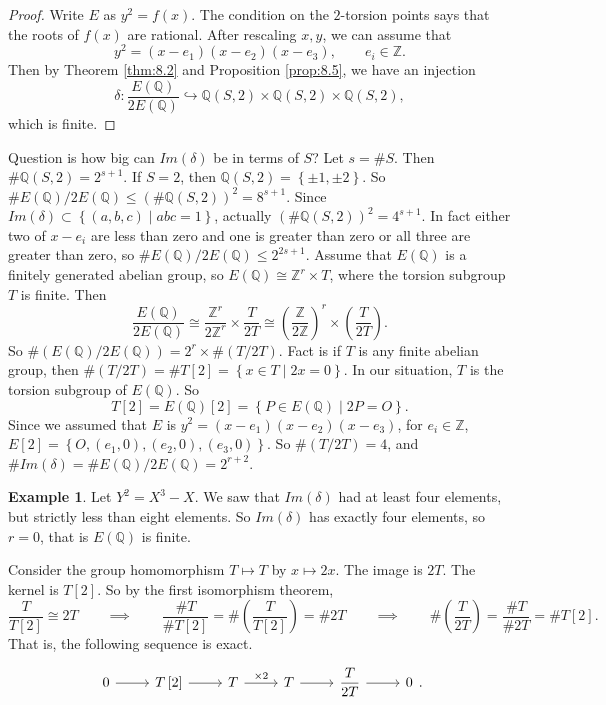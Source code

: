 \documentclass{article}
\newcommand{\Z}{\mathbb{Z}}
\newcommand{\Q}{\mathbb{Q}}
\newcommand{\rb}[1]{\left( #1 \right)}
\renewcommand{\sb}[1]{\left[ #1 \right]}
\newcommand{\cb}[1]{\left\{ #1 \right\}}
\theoremstyle{definition}\newtheorem{definition}{Definition}[section]
\theoremstyle{definition}\newtheorem{remark}[definition]{Remark}
\theoremstyle{definition}\newtheorem*{example}{Example}
\theoremstyle{definition}\newtheorem*{note}{Note}
\begin{document}
\begin{proof}
Write $ E $ as $ y^2 = f\rb{x} $. The condition on the $ 2 $-torsion points says that the roots of $ f\rb{x} $ are rational. After rescaling $ x, y $, we can assume that
$$ y^2 = \rb{x - e_1}\rb{x - e_2}\rb{x - e_3}, \qquad e_i \in \Z. $$
Then by Theorem \ref{thm:8.2} and Proposition \ref{prop:8.5}, we have an injection
$$ \delta : \dfrac{E\rb{\Q}}{2E\rb{\Q}} \hookrightarrow \Q\rb{S, 2} \times \Q\rb{S, 2} \times \Q\rb{S, 2}, $$
which is finite.
\end{proof}

Question is how big can $ Im\rb{\delta} $ be in terms of $ S $? Let $ s = \#S $. Then $ \#\Q\rb{S, 2} = 2^{s + 1} $. If $ S = 2 $, then $ \Q\rb{S, 2} = \cb{\pm 1, \pm 2} $. So $ \#E\rb{\Q} / 2E\rb{\Q} \le \rb{\#\Q\rb{S, 2}}^2 = 8^{s + 1} $. Since $ Im\rb{\delta} \subset \cb{\rb{a, b, c} \mid abc = 1} $, actually $ \rb{\#\Q\rb{S, 2}}^2 = 4^{s + 1} $. In fact either two of $ x - e_i $ are less than zero and one is greater than zero or all three are greater than zero, so $ \#E\rb{\Q} / 2E\rb{\Q} \le 2^{2s + 1} $. Assume that $ E\rb{\Q} $ is a finitely generated abelian group, so $ E\rb{\Q} \cong \Z^r \times T $, where the torsion subgroup $ T $ is finite. Then
$$ \dfrac{E\rb{\Q}}{2E\rb{\Q}} \cong \dfrac{\Z^r}{2\Z^r} \times \dfrac{T}{2T} \cong \rb{\dfrac{\Z}{2\Z}}^r \times \rb{\dfrac{T}{2T}}. $$
So $ \#\rb{E\rb{\Q} / 2E\rb{\Q}} = 2^r \times \#\rb{T / 2T} $. Fact is if $ T $ is any finite abelian group, then $ \#\rb{T / 2T} = \#T\sb{2} = \cb{x \in T \mid 2x = 0} $. In our situation, $ T $ is the torsion subgroup of $ E\rb{\Q} $. So
$$ T\sb{2} = E\rb{\Q}\sb{2} = \cb{P \in E\rb{\Q} \mid 2P = O}. $$
Since we assumed that $ E $ is $ y^2 = \rb{x - e_1}\rb{x - e_2}\rb{x - e_3} $, for $ e_i \in \Z $, $ E\sb{2} = \cb{O, \rb{e_1, 0}, \rb{e_2, 0}, \rb{e_3, 0}} $. So $ \#\rb{T / 2T} = 4 $, and $ \#Im\rb{\delta} = \#E\rb{\Q} / 2E\rb{\Q} = 2^{r + 2} $.

\begin{example}
Let $ Y^2 = X^3 - X $. We saw that $ Im\rb{\delta} $ had at least four elements, but strictly less than eight elements. So $ Im\rb{\delta} $ has exactly four elements, so $ r = 0 $, that is $ E\rb{\Q} $ is finite.
\end{example}

Consider the group homomorphism $ T \mapsto T $ by $ x \mapsto 2x $. The image is $ 2T $. The kernel is $ T\sb{2} $. So by the first isomorphism theorem,
$$ \dfrac{T}{T\sb{2}} \cong 2T \qquad \implies \qquad \dfrac{\#T}{\#T\sb{2}} = \#\rb{\dfrac{T}{T\sb{2}}} = \#2T \qquad \implies \qquad \#\rb{\dfrac{T}{2T}} = \dfrac{\#T}{\#2T} = \#T\sb{2}. $$
That is, the following sequence is exact.
$$
\begin{tikzcd}
0 \arrow{r} & T\sb{2} \arrow{r} & T \arrow{r}{\times 2} & T \arrow{r} & \dfrac{T}{2T} \arrow{r} & 0
\end{tikzcd}.
$$
\end{document}
